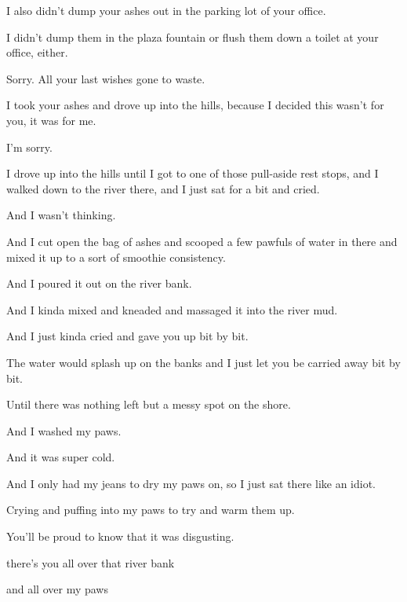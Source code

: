 { I also didn't dump your ashes out in the parking lot of your office.

 I didn't dump them in the plaza fountain or flush them down a toilet at your office, either.

 Sorry. All your last wishes gone to waste.

 I took your ashes and drove up into the hills, because I decided this wasn't for you, it was for me.

 I'm sorry.

 I drove up into the hills until I got to one of those pull-aside rest stops, and I walked down to the river there, and I just sat for a bit and cried.

 And I wasn't thinking.

 And I cut open the bag of ashes and scooped a few pawfuls of water in there and mixed it up to a sort of smoothie consistency.

 And I poured it out on the river bank.

 And I kinda mixed and kneaded and massaged it into the river mud.

 And I just kinda cried and gave you up bit by bit.

 The water would splash up on the banks and I just let you be carried away bit by bit.

 Until there was nothing left but a messy spot on the shore.

 And I washed my paws.

 And it was super cold.

 And I only had my jeans to dry my paws on, so I just sat there like an idiot.

 Crying and puffing into my paws to try and warm them up.

 You'll be proud to know that it was disgusting.

 there's you all over that river bank

 and all over my paws

}
